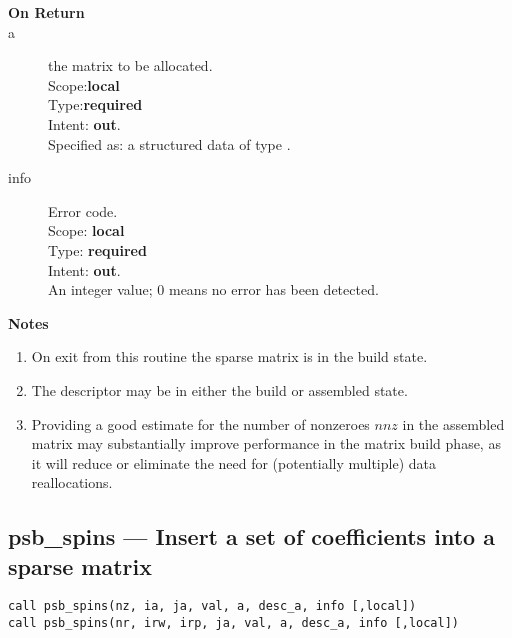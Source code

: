 \begin{description}
\item[\bf On Return]
\item[a] the matrix to be allocated.\\
Scope:{\bf local}\\
Type:{\bf required}\\
Intent: {\bf out}.\\
Specified as: a structured data of type \spdata.
\item[info] Error code.\\
Scope: {\bf local} \\
Type: {\bf required} \\
Intent: {\bf out}.\\
An integer value; 0 means no error has been detected. 
\end{description}
{\par\noindent\large\bfseries Notes}
\begin{enumerate}
\item On exit from this routine the sparse matrix  is in the build
  state.
\item The descriptor may be in either the build or assembled state.
\item Providing a good estimate for the number of nonzeroes $nnz$ in
  the assembled matrix may substantially improve performance in the
  matrix build phase, as it will reduce or eliminate the need for
  (potentially multiple) data reallocations. 
\end{enumerate}



%
%
\clearpage\subsection{psb\_spins --- Insert a set of coefficients into a sparse
  matrix}

\begin{verbatim}
call psb_spins(nz, ia, ja, val, a, desc_a, info [,local])
call psb_spins(nr, irw, irp, ja, val, a, desc_a, info [,local])
\end{verbatim}

